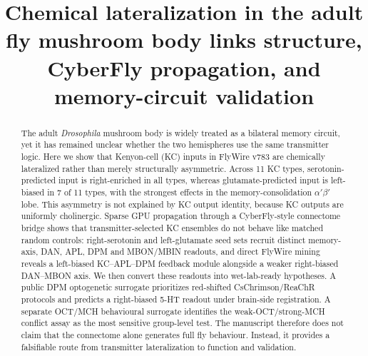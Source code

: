 \documentclass[10pt]{article}
\title{\Large\bfseries Chemical lateralization in the adult fly mushroom body links structure, CyberFly propagation, and memory-circuit validation}
\author{}
\date{}
\begin{document}
\maketitle
\thispagestyle{empty}

\begin{abstract}
The adult \textit{Drosophila} mushroom body is widely treated as a bilateral memory circuit, yet it has remained unclear whether the two hemispheres use the same transmitter logic. Here we show that Kenyon-cell (KC) inputs in FlyWire v783 are chemically lateralized rather than merely structurally asymmetric. Across 11 KC types, serotonin-predicted input is right-enriched in all types, whereas glutamate-predicted input is left-biased in 7 of 11 types, with the strongest effects in the memory-consolidation $\alpha'\beta'$ lobe. This asymmetry is not explained by KC output identity, because KC outputs are uniformly cholinergic. Sparse GPU propagation through a CyberFly-style connectome bridge shows that transmitter-selected KC ensembles do not behave like matched random controls: right-serotonin and left-glutamate seed sets recruit distinct memory-axis, DAN, APL, DPM and MBON/MBIN readouts, and direct FlyWire mining reveals a left-biased KC--APL--DPM feedback module alongside a weaker right-biased DAN--MBON axis. We then convert these readouts into wet-lab-ready hypotheses. A public DPM optogenetic surrogate prioritizes red-shifted CsChrimson/ReaChR protocols and predicts a right-biased 5-HT readout under brain-side registration. A separate OCT/MCH behavioural surrogate identifies the weak-OCT/strong-MCH conflict assay as the most sensitive group-level test. The manuscript therefore does not claim that the connectome alone generates full fly behaviour. Instead, it provides a falsifiable route from transmitter lateralization to function and validation.
\end{abstract}

\end{document}
